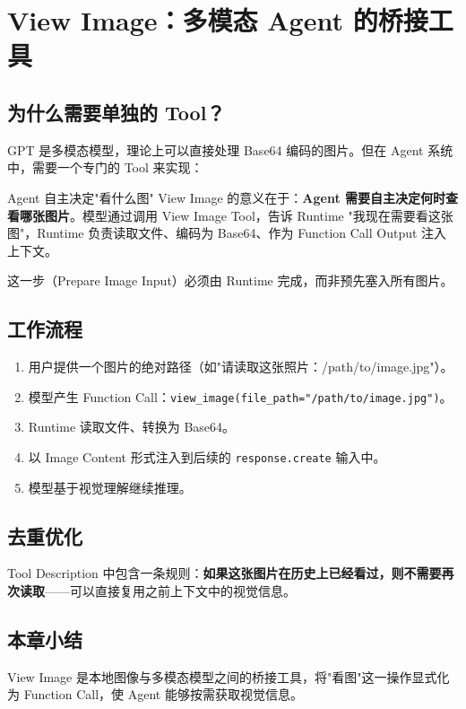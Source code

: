 \section{View Image：多模态 Agent 的桥接工具}

\subsection{为什么需要单独的 Tool？}

GPT 是多模态模型，理论上可以直接处理 Base64 编码的图片。但在 Agent 系统中，需要一个专门的 Tool 来实现：

\begin{knowledgebox}{Agent 自主决定"看什么图"}
View Image 的意义在于：\textbf{Agent 需要自主决定何时查看哪张图片}。模型通过调用 View Image Tool，告诉 Runtime "我现在需要看这张图"，Runtime 负责读取文件、编码为 Base64、作为 Function Call Output 注入上下文。

这一步（Prepare Image Input）必须由 Runtime 完成，而非预先塞入所有图片。
\end{knowledgebox}

\subsection{工作流程}

\begin{enumerate}
    \item 用户提供一个图片的绝对路径（如"请读取这张照片：/path/to/image.jpg"）。
    \item 模型产生 Function Call：\texttt{view\_image(file\_path="/path/to/image.jpg")}。
    \item Runtime 读取文件、转换为 Base64。
    \item 以 Image Content 形式注入到后续的 \texttt{response.create} 输入中。
    \item 模型基于视觉理解继续推理。
\end{enumerate}

\subsection{去重优化}

Tool Description 中包含一条规则：\textbf{如果这张图片在历史上已经看过，则不需要再次读取}——可以直接复用之前上下文中的视觉信息。

\subsection{本章小结}

View Image 是本地图像与多模态模型之间的桥接工具，将"看图"这一操作显式化为 Function Call，使 Agent 能够按需获取视觉信息。


